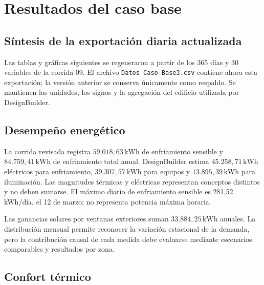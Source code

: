 
\par\medskip
\section{Resultados del caso base}



\subsection{Síntesis de la exportación diaria actualizada}
\begin{textoDosTercios}
Las tablas y gráficas siguientes se regeneraron a partir de los 365 días y 30 variables de la corrida 09. El archivo \texttt{Datos Caso Base3.csv} contiene ahora esta exportación; la versión anterior se conserva únicamente como respaldo. Se mantienen las unidades, los signos y la agregación del edificio utilizada por DesignBuilder.
\end{textoDosTercios}



\subsection{Desempeño energético}

\begin{textoDosTercios}
La corrida revisada registra $59.018,63\,\mathrm{kWh}$ de enfriamiento sensible y $84.759,41\,\mathrm{kWh}$ de enfriamiento total anual. DesignBuilder estima $45.258,71\,\mathrm{kWh}$ eléctricos para enfriamiento, $39.307,57\,\mathrm{kWh}$ para equipos y $13.895,39\,\mathrm{kWh}$ para iluminación. Las magnitudes térmicas y eléctricas representan conceptos distintos y no deben sumarse. El máximo diario de enfriamiento sensible es 281,52 kWh/día, el 12 de marzo; no representa potencia máxima horaria.

Las ganancias solares por ventanas exteriores suman $33.884,25\,\mathrm{kWh}$ anuales. La distribución mensual permite reconocer la variación estacional de la demanda, pero la contribución causal de cada medida debe evaluarse mediante escenarios comparables y resultados por zona.
\end{textoDosTercios}

\subsection{Confort térmico}

